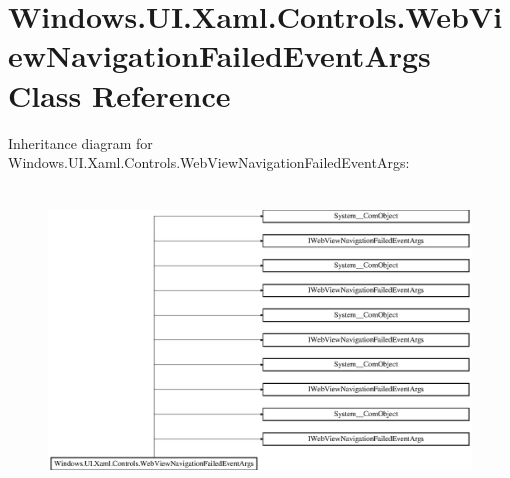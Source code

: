 \hypertarget{class_windows_1_1_u_i_1_1_xaml_1_1_controls_1_1_web_view_navigation_failed_event_args}{}\section{Windows.\+U\+I.\+Xaml.\+Controls.\+Web\+View\+Navigation\+Failed\+Event\+Args Class Reference}
\label{class_windows_1_1_u_i_1_1_xaml_1_1_controls_1_1_web_view_navigation_failed_event_args}
Inheritance diagram for Windows.\+U\+I.\+Xaml.\+Controls.\+Web\+View\+Navigation\+Failed\+Event\+Args\+:\begin{figure}[H]
\begin{center}
\leavevmode
\includegraphics[height=8.126648cm]{class_windows_1_1_u_i_1_1_xaml_1_1_controls_1_1_web_view_navigation_failed_event_args}
\end{center}
\end{figure}
